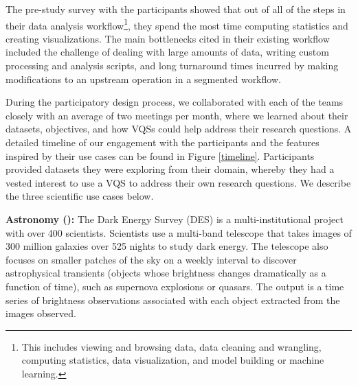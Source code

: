 \par The pre-study survey with the participants showed that out of all of the steps in their data analysis workflow\footnote{This includes viewing and browsing data, data cleaning and wrangling, computing statistics, data visualization, and model building or machine learning.}, they spend the most time computing statistics and creating visualizations.
The main bottlenecks cited in their existing workflow included the challenge of dealing with large amounts of data, writing custom processing and analysis scripts, and long turnaround times incurred by making modifications to an upstream operation in a segmented workflow. 
\par During the participatory design process, we collaborated with each of the teams closely with an average of two meetings per month, where we learned about their datasets, objectives, and how VQSs could help address their research questions. A detailed timeline of our engagement with the participants and the features inspired by their use cases can be found in Figure \ref{timeline}. Participants provided datasets they were exploring from their domain, whereby they had a vested interest to use a VQS to address their own research questions. We  describe the three scientific use cases below.

\par \textbf{Astronomy (\astro):} The Dark Energy Survey (DES) is a multi-institutional project with over 400 scientists. Scientists use a multi-band telescope that takes images of 300 million galaxies over 525 nights to study dark energy\cite{Drlica-Wagner2017}. The telescope also focuses on smaller patches of the sky on a weekly interval to discover astrophysical transients (objects whose brightness changes dramatically as a function of time), such as supernova explosions or quasars. The output is a time series of brightness observations associated with each object extracted from the images observed. %


